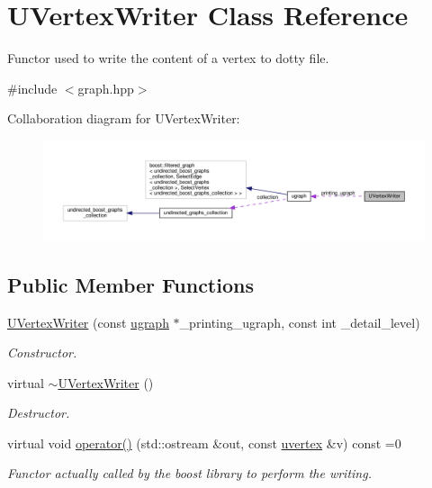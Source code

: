 \hypertarget{classUVertexWriter}{}\section{U\+Vertex\+Writer Class Reference}
\label{classUVertexWriter}


Functor used to write the content of a vertex to dotty file.  




{\ttfamily \#include $<$graph.\+hpp$>$}



Collaboration diagram for U\+Vertex\+Writer\+:
\nopagebreak
\begin{figure}[H]
\begin{center}
\leavevmode
\includegraphics[width=350pt]{d5/d8d/classUVertexWriter__coll__graph}
\end{center}
\end{figure}
\subsection*{Public Member Functions}
\begin{DoxyCompactItemize}
\item 
\hyperlink{classUVertexWriter_adbded0aed103a0e27e48b7f84a471dbf}{U\+Vertex\+Writer} (const \hyperlink{structugraph}{ugraph} $\ast$\+\_\+printing\+\_\+ugraph, const int \+\_\+detail\+\_\+level)
\begin{DoxyCompactList}\small\item\em Constructor. \end{DoxyCompactList}\item 
virtual \hyperlink{classUVertexWriter_aa417baae07ce273a00e8def01d073621}{$\sim$\+U\+Vertex\+Writer} ()
\begin{DoxyCompactList}\small\item\em Destructor. \end{DoxyCompactList}\item 
virtual void \hyperlink{classUVertexWriter_a218953915a49ce9852c000df1476601a}{operator()} (std\+::ostream \&out, const \hyperlink{graph_8hpp_a56f73e449b2c08195207c387d6c422cd}{uvertex} \&v) const =0
\begin{DoxyCompactList}\small\item\em Functor actually called by the boost library to perform the writing. \end{DoxyCompactList}\end{DoxyCompactItemize}
